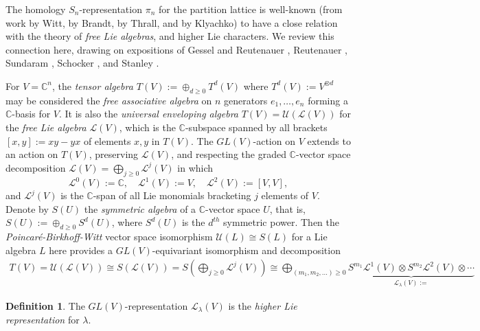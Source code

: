 \documentclass[12pt]{amsart}
\theoremstyle{plain}
\theoremstyle{definition}
\newtheorem{defn}[thm]{Definition}
\begin{document}
The homology $S_n$-representation $\pi_n$ for the partition lattice
is well-known (from work
by Witt, by Brandt, by Thrall, and by Klyachko) to have a close relation
with the theory of {\it free Lie algebras}, and higher Lie characters.   We review this connection
here, drawing on expositions of 
Gessel and Reutenauer \cite{GesselReutenauer}, 
Reutenauer \cite[Chap. 8]{Reutenauer}, 
Sundaram \cite[Intro.]{Sundaram}, 
Schocker \cite{Schocker}, 
and Stanley \cite[Exer. 7.89]{Stanley}.

For $V={{\mathbb C}}^n$,
the {\it tensor algebra $T(V):=\oplus_{d \geq 0} T^d(V)$} where 
$T^d(V):=V^{\otimes d}$ may be considered the {\it free associative
algebra} on $n$ generators $e_1,\ldots,e_n$ forming a ${{\mathbb C}}$-basis for $V$.
It is also the {\it universal enveloping algebra} 
$T(V) = {{\mathcal{U}}}({{\mathcal{L}}}(V))$ for the {\it free Lie algebra}
${{\mathcal{L}}}(V)$, which is the ${{\mathbb C}}$-subspace spanned by all brackets
$
[x,y]:=xy -yx
$
of elements $x,y$ in $T(V)$. 
The $GL(V)$-action on $V$ extends to an action
on $T(V)$, preserving ${{\mathcal{L}}}(V)$, and respecting
the graded ${{\mathbb C}}$-vector space decomposition
$
{{\mathcal{L}}}(V)=\bigoplus_{j \geq 0}{{\mathcal{L}}}^j(V)
$
in which 
$$
{{\mathcal{L}}}^0(V):={{\mathbb C}}, \quad
{{\mathcal{L}}}^1(V):=V, \quad
{{\mathcal{L}}}^2(V):=[V,V],
$$
and ${{\mathcal{L}}}^j(V)$ 
is the ${{\mathbb C}}$-span of all Lie monomials bracketing $j$ elements of $V$.
Denote by $S(U)$ the {\it symmetric algebra} of
a ${{\mathbb C}}$-vector space $U$, that is, 
$S(U):=\oplus_{d \geq 0} S^d(U)$,  where $S^d(U)$ is the
$d^{th}$ symmetric power.  Then  the {\it Poincar\'e-Birkhoff-Witt} vector
space isomorphism ${{\mathcal{U}}}(L) \cong S(L)$ for a Lie algebra $L$ here 
provides a $GL(V)$-equivariant isomorphism and decomposition
$$
\begin{aligned}
T(V) ={{\mathcal{U}}}({{\mathcal{L}}}(V))
 \cong S\left( {{\mathcal{L}}}(V) \right)
 = S\left( \bigoplus_{j \geq 0} {{\mathcal{L}}}^j(V) \right) 
  \cong \bigoplus_{(m_1,m_2,\ldots) \geq 0}
        \underbrace{S^{m_1}{{\mathcal{L}}}^1(V) \otimes 
          S^{m_2}{{\mathcal{L}}}^2(V) \otimes 
              \cdots}_{{{\mathcal{L}}}_\lambda(V):=}
\end{aligned}
$$

\begin{defn}
The $GL(V)$-representation ${{\mathcal{L}}}_\lambda(V)$ is
the {\it higher Lie representation} for $\lambda$.
\end{defn}
\end{document}
